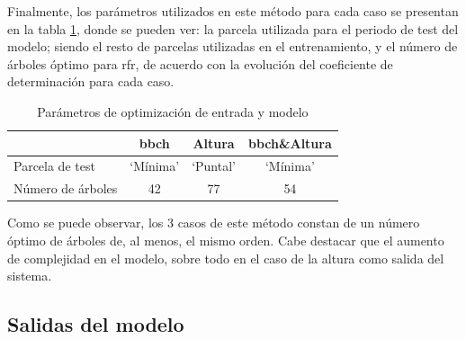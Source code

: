 \par Finalmente, los parámetros utilizados en este método para cada caso se presentan en la tabla \ref{tab:opt_parcl}, donde se pueden ver: la parcela utilizada para el periodo de test del modelo; siendo el resto de parcelas utilizadas en el entrenamiento, y el número de árboles óptimo para \gls{rfr}, de acuerdo con la evolución del coeficiente de determinación para cada caso.

\begin{table}[h]
\centering
\begin{tabular}{l|ccc}
                  & \gls{bbch}     & Altura   & \gls{bbch}\&Altura \\ \hline
Parcela de test   & `Mínima' & `Puntal' & `Mínima'     \\
Número de árboles & 42       & 77       & 54          
\end{tabular}
\caption{Parámetros de optimización de entrada y modelo
\label{tab:opt_parcl}}
\end{table}

\par Como se puede observar, los 3 casos de este método constan de un número óptimo de árboles de, al menos, el mismo orden. Cabe destacar que el aumento de complejidad en el modelo, sobre todo en el caso de la altura como salida del sistema.  
\subsection{Salidas del modelo}
